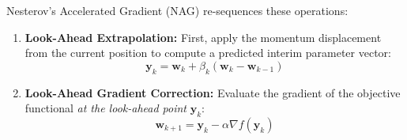 Nesterov's Accelerated Gradient (NAG) re-sequences these operations:
\begin{enumerate}
    \item \textbf{Look-Ahead Extrapolation:} First, apply the momentum displacement from the current position to compute a predicted interim parameter vector:
    \begin{equation}
    \mathbf{y}_k = \mathbf{w}_k + \beta_k (\mathbf{w}_k - \mathbf{w}_{k-1})
    \label{eq:nesterov_lookahead}
    \end{equation}
    \item \textbf{Look-Ahead Gradient Correction:} Evaluate the gradient of the objective functional \emph{at the look-ahead point} $\mathbf{y}_k$:
    \begin{equation}
    \mathbf{w}_{k+1} = \mathbf{y}_k - \alpha \nabla f(\mathbf{y}_k)
    \label{eq:nesterov_update}
    \end{equation}
\end{enumerate}

